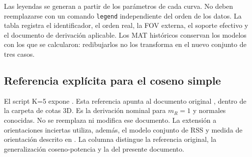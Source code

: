 \documentclass[11pt,a4paper]{article}
\begin{document}
Las leyendas se generan a partir de los parámetros de cada curva. No deben reemplazarse con un comando \texttt{legend} independiente del orden de los datos. La tabla  registra el identificador, el orden real, la FOV externa, el soporte efectivo y el documento de derivación aplicable. Los MAT históricos conservan los modelos con los que se calcularon: redibujarlos no los transforma en el nuevo conjunto de tres casos.

\subsection{Referencia explícita para el coseno simple}
El script K=5 expone . Esta referencia apunta al documento original , dentro de la carpeta de cotas 3D. Es la derivación nominal para $m_R=1$ y normales conocidas. No se reemplaza ni modifica ese documento. La extensión a orientaciones inciertas utiliza, además, el modelo conjunto de RSS y medida de orientación descrito en . La columna  distingue la referencia original, la generalización coseno-potencia y la del presente documento.
\end{document}
